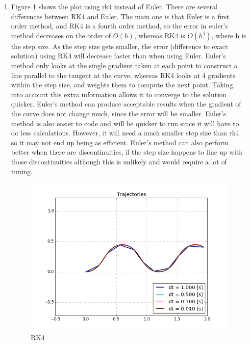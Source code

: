 \documentclass[12pt,a4paper]{article}
\begin{document}
\begin{enumerate}[label=(\alph*)]
	\item Figure \ref{fig:rk4} shows the plot using rk4 instead of Euler. There are several differences between RK4 and Euler. The main one is that Euler is a first order method, and RK4 is a fourth order method, so the error in euler's method decreases on the order of $O(h)$, whereas RK4 is $O(h^4)$, where h is the step size. As the step size gets smaller, the error (difference to exact solution) using RK4 will decrease faster than when using Euler. Euler's method only looks at the single gradient taken at each point to construct a line parallel to the tangent at the curve, whereas RK4 looks at 4 gradients within the step size, and weights them to compute the next point. Taking into account this extra information allows it to converge to the solution quicker. Euler's method can produce acceptable results when the gradient of the curve does not change much, since the error will be smaller. Euler's method is also easier to code and will be quicker to run since it will have to do less calculations. However, it will need a much smaller step size than rk4 so it may not end up being as efficient. Euler's method can also perform better when there are discontinuities, if the step size happens to line up with those discontinuities although this is unlikely and would require a lot of tuning.
	      \begin{figure}[h!]
	      	\centering
	      	\includegraphics[width=\textwidth]{fig/1e.png}
	      	\caption{RK4}
	      	\label{fig:rk4}
	      \end{figure}

\end{enumerate}
\end{document}
